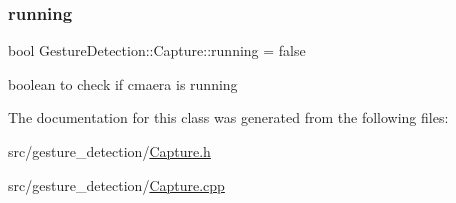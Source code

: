 \subsubsection{\texorpdfstring{running}{running}}
{\footnotesize\ttfamily bool Gesture\+Detection\+::\+Capture\+::running = false}



boolean to check if cmaera is running 



The documentation for this class was generated from the following files\+:\begin{DoxyCompactItemize}
\item 
src/gesture\+\_\+detection/\hyperlink{Capture_8h}{Capture.\+h}\item 
src/gesture\+\_\+detection/\hyperlink{Capture_8cpp}{Capture.\+cpp}\end{DoxyCompactItemize}
